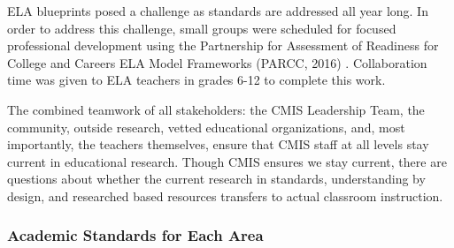 \begin{findings}

ELA blueprints posed a challenge as standards are addressed all year long. In order to address this challenge, small groups were scheduled for focused professional development using the Partnership for Assessment of Readiness for College and Careers ELA Model Frameworks (PARCC, 2016) . Collaboration time was given to ELA teachers in grades 6-12 to complete this work. 


The combined teamwork of all stakeholders: the CMIS Leadership Team, the community, outside research, vetted educational organizations, and, most importantly,  the teachers themselves, ensure that CMIS staff at all levels stay current in educational research. Though CMIS ensures we stay current, there are questions about whether the current research in standards, understanding by design, and researched based resources transfers to actual classroom instruction. 
\end{findings}

\subsubsection{Academic Standards for Each Area}



